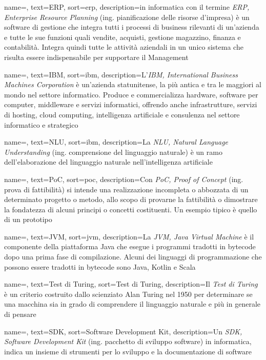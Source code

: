 {
    name=,
    text=ERP,
    sort=erp,
    description={in informatica con il termine \emph{ERP, Enterprise Resource Planning} (ing. pianificazione delle risorse d'impresa) è un software di gestione che integra tutti i processi di business rilevanti di un'azienda e tutte le sue funzioni quali vendite, acquisti, gestione magazzino, finanza e contabilità. Integra quindi tutte le attività aziendali in un unico sistema che risulta essere indispensabile per supportare il Management}
}

{
	name=,
	text=IBM,
	sort=ibm,
	description={L'\emph{IBM, International Business Machines Corporation} è un'azienda statunitense, la più antica e tra le maggiori al mondo nel settore informatico. Produce e commercializza hardware, software per computer, middleware e servizi informatici, offrendo anche infrastrutture, servizi di hosting, cloud computing, intelligenza artificiale e consulenza nel settore informatico e strategico}
}

{
	name=,
	text=NLU,
	sort=ibm,
	description={La \emph{NLU, Natural Language Understanding} (ing. comprensione del linguaggio naturale) è un ramo dell'elaborazione del linguaggio naturale nell'intelligenza artificiale}
}

{
	name=,
	text=PoC,
	sort=poc,
	description={Con \emph{PoC, Proof of Concept} (ing. prova di fattibilità) si intende una realizzazione incompleta o abbozzata di un determinato progetto o metodo, allo scopo di provarne la fattibilità o dimostrare la fondatezza di alcuni principi o concetti costituenti. Un esempio tipico è quello di un prototipo}
}

{
	name=,
	text=JVM,
	sort=jvm,
	description={La \emph{JVM, Java Virtual Machine} è il componente della piattaforma Java che esegue i programmi tradotti in bytecode dopo una prima fase di compilazione. Alcuni dei linguaggi di programmazione che possono essere tradotti in bytecode sono Java, Kotlin e Scala}
}

{
	name=,
	text=Test di Turing,
	sort=Test di Turing,
	description={Il \emph{Test di Turing} è un criterio costruito dallo scienziato Alan Turing nel 1950 per determinare se una macchina sia in grado di comprendere il linguaggio naturale e più in generale di pensare}
}

{
	name=,
	text=SDK,
	sort=Software Development Kit,
	description={Un \emph{SDK, Software Development Kit} (ing. pacchetto di sviluppo software) in informatica, indica un insieme di strumenti per lo sviluppo e la documentazione di software}
}

